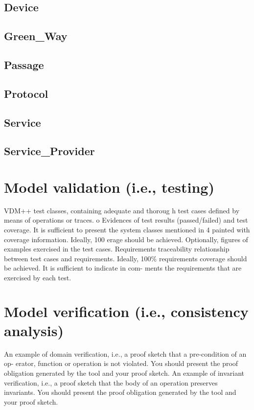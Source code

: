 \documentclass[a4paper]{article}
\begin{document}
\subsection{Device}

\subsection{Green\_Way}

\subsection{Passage}

\subsection{Protocol}

\subsection{Service}

\subsection{Service\_Provider}

\section{Model validation (i.e., testing)}
VDM++ test classes, containing adequate and thoroug
h test cases defined by means of 
operations or traces.  
o
Evidences of test results (passed/failed) and test 
coverage. It is sufficient to present the 
system classes mentioned in 4 painted with coverage
 information. Ideally, 100%
erage should be achieved. 
Optionally, figures of examples exercised in the test cases. 
Requirements  traceability  relationship  between  test  cases  and requirements.  Ideally, 100\%  requirements  coverage  should  be  achieved.  It  is  sufficient  to  indicate  in  com-
ments the requirements that are exercised by each test. 
\section{Model verification (i.e., consistency analysis)}
An example of domain verification, i.e., a proof sketch that a pre-condition of an op-
erator, function or operation is not violated. You 
should present the proof obligation 
generated by the tool and your proof sketch.  
An example of invariant verification, i.e., a proof sketch that the body of an operation 
preserves  invariants.  You  should  present  the  proof obligation  generated  by  the  tool 
and your proof sketch. 
\end{document}
